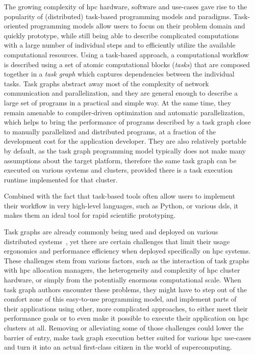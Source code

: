 The growing complexity of \gls{hpc} hardware, software and use-cases gave rise to the
popularity of (distributed) task-based programming models and paradigms. Task-oriented programming
models allow users to focus on their problem domain and quickly prototype, while still being able
to describe complicated computations with a large number of individual steps and to efficiently
utilize the available computational resources. Using a task-based approach, a computational
workflow is described using a set of atomic computational blocks (\emph{tasks}) that are
composed together in a \emph{task graph} which captures dependencies between the individual
tasks. Task graphs abstract away most of the complexity of network communication and
parallelization, and they are general enough to describe a large set of programs in a practical and
simple way. At the same time, they remain amenable to compiler-driven optimization and automatic
parallelization, which helps to bring the performance of programs described by a task graph close
to manually parallelized and distributed programs, at a fraction of the development cost for the
application developer. They are also relatively portable by default, as the task graph programming
model typically does not make many assumptions about the target platform, therefore the same task
graph can be executed on various systems and clusters, provided there is a task execution runtime
implemented for that cluster.

Combined with the fact that task-based tools often allow users to implement their workflow in very
high-level languages, such as Python, or various \glspl{dsl}, it makes them an ideal
tool for rapid scientific prototyping.

Task graphs are already commonly being used and deployed on various distributed
systems~\cite{pegasus, workflows_at_scale, large_scale_modelling}, yet there are certain challenges that limit their usage ergonomics
and performance efficiency when deployed specifically on \gls{hpc} systems. These
challenges stem from various factors, such as the interaction of task graphs with
\gls{hpc} allocation managers, the heterogeneity and complexity of
\gls{hpc} cluster hardware, or simply from the potentially enormous computational
scale. When task graph authors encounter these problems, they might have to step out of the comfort
zone of this easy-to-use programming model, and implement parts of their applications using other,
more complicated approaches, to either meet their performance goals or to even make it possible to
execute their application on \gls{hpc} clusters at all. Removing or alleviating some
of those challenges could lower the barrier of entry, make task graph execution better suited for
various \gls{hpc} use-cases and turn it into an actual first-class citizen in the
world of supercomputing\@.

